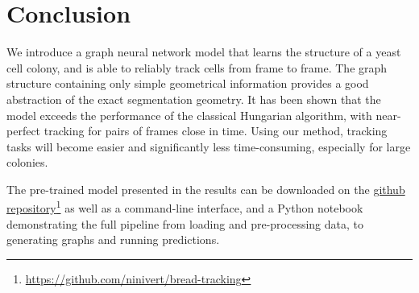 \documentclass[10pt,conference,compsocconf,a4paper]{IEEEtran}
\newcommand{\nunit}[1]{\ \si{#1}}  %
\newcommand*{\shortautoref}[1]{%
	\begingroup
	\def\equationautorefname{\textsc{Eq.}}%
	\def\tableautorefname{\textsc{Tab.}}%
	\def\figureautorefname{\textsc{Fig.}}%
	\autoref{#1}%
	\endgroup
}
\begin{document}




\section{Conclusion}

	We introduce a graph neural network model that learns the structure of a yeast cell colony, and is able to reliably track cells from frame to frame. The graph structure containing only simple geometrical information provides a good abstraction of the exact segmentation geometry. It has been shown that the model exceeds the performance of the classical Hungarian algorithm, with near-perfect tracking for pairs of frames close in time.
	Using our method, tracking tasks will become easier and significantly less time-consuming, especially for large colonies.
	
	The pre-trained model presented in the results can be downloaded on the \href{https://github.com/ninivert/bread-tracking}{github repository}\footnote{\href{https://github.com/ninivert/bread-tracking}{https://github.com/ninivert/bread-tracking}} as well as a command-line interface, and a Python notebook demonstrating the full pipeline from loading and pre-processing data, to generating graphs and running predictions.
\end{document}
